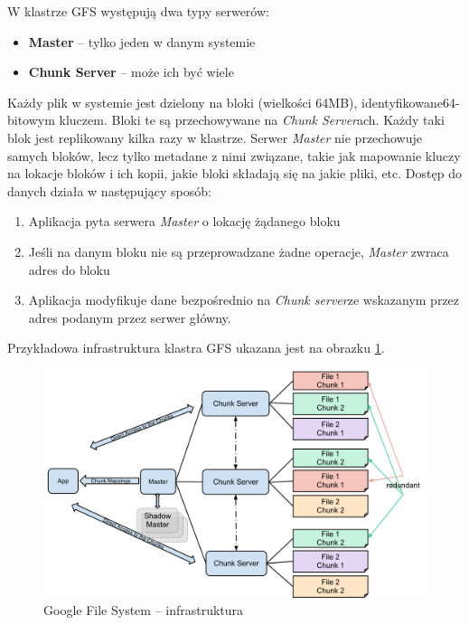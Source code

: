 \documentclass[10pt,twocolumn]{llncs}          %
\begin{document}
W klastrze GFS występują dwa typy serwerów:
\begin{itemize}
    \item \textbf{Master} -- tylko jeden w danym systemie
    \item \textbf{Chunk Server} -- może ich być wiele
\end{itemize}
Każdy plik w systemie jest dzielony na bloki (wielkości 64MB), identyfikowane64-bitowym kluczem. Bloki te są przechowywane na \textit{Chunk Server}ach. Każdy taki blok jest replikowany kilka razy w klastrze.
Serwer \textit{Master} nie przechowuje samych bloków, lecz tylko metadane z nimi związane, takie jak mapowanie kluczy na lokacje bloków i ich kopii, jakie bloki składają się na jakie pliki, etc.
Dostęp do danych działa w następujący sposób:
\begin{enumerate}
    \item Aplikacja pyta serwera \textit{Master} o lokację żądanego bloku
    \item Jeśli na danym bloku nie są przeprowadzane żadne operacje, \textit{Master} zwraca adres do bloku
    \item Aplikacja modyfikuje dane bezpośrednio na \textit{Chunk server}ze wskazanym przez adres podanym przez serwer główny.
\end{enumerate}

Przykładowa infrastruktura klastra GFS ukazana jest na obrazku \ref{fig:google:gfs}.


\begin{figure}
    \includegraphics[scale=0.1]{obrazki/GoogleFileSystemGFS.png}
    \caption{Google File System -- infrastruktura}
    \label{fig:google:gfs}       %
\end{figure}
\end{document}
